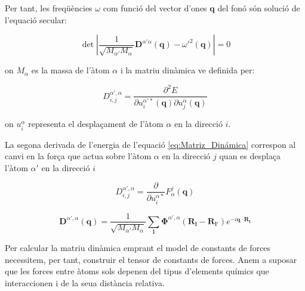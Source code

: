\documentclass[12pt]{article} %
\let\vec\mathbf %
\begin{document}
Per tant, les freqüències $\omega$ com funció del vector d'ones $\vec q$ del fonó són solució de l'equació secular:

\begin{equation}
\label{eq:secular}
\det\left|\frac{1}{\sqrt{M_{\alpha'} M_{\alpha}}}\vec D^{\alpha'\alpha}\left(\vec q\right)-{\omega'}^2\left(\vec q\right)\right|=0 
\end{equation}

on $M_{\alpha}$ es la massa de l'àtom $\alpha$ i la matriu dinàmica ve definida per:

\begin{equation}
D^{\alpha',\alpha}_{i,j}=\frac{\partial^2 E}{\partial u^{\alpha'*}_i(\vec q)\partial u^{\alpha}_{j}(\vec q)}
\label{eq:Matriz_Dinámica}
\end{equation}

on $u^{\alpha}_{i}$ representa el despla\c{c}ament de l'àtom $\alpha$ en la direcció $i$.

La segona derivada de l'energia de l'equació \ref{eq:Matriz_Dinámica} correspon al canvi en la for\c{c}a que actua sobre l'àtom $\alpha$ en la direcció $j$ quan es despla\c{c}a l'àtom $\alpha'$ en la direcció $i$

\begin{equation}
D^{\alpha',\alpha}_{i,j}=\frac{\partial}{\partial u^{\alpha*}_{i}}F^{j}_{\alpha}(\vec q)
\end{equation}


\begin{equation}
 \label{eq:matriu_dinàmica}
 \boxed{
 \vec D^{\alpha',\alpha}(\vec q)=\frac{1}{\sqrt{M_{\alpha'} M_{\alpha}}}\sum_\vec l\vec\Phi^{\alpha',\alpha}\left(\vec R_\vec l-\vec R_{\vec l'}\right)e^{-i\vec q\cdot\vec R_\vec l}}
\end{equation}




Per calcular la matriu dinàmica emprant el model de constants de forces necessitem, per tant, construir el tensor de constants de forces. Anem a suposar que les forces entre àtoms sols depenen del tipus d'elements químics que interaccionen i de la seua distància relativa.
\end{document}
